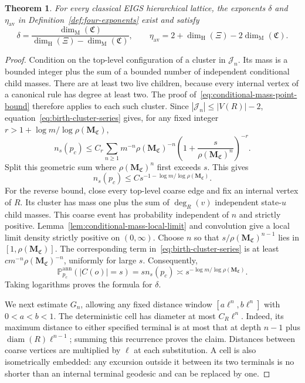 \documentclass[scheme=plain,11pt]{ctexart}
\newtheorem{theorem}{Theorem}[section]
\theoremstyle{definition}
\theoremstyle{remark}
\newcommand{\dimhaus}{\dim_{\mathrm H}}
\newcommand{\dimmass}{\dim_{\mathrm M}}
\begin{document}
\begin{theorem}\label{thm:delta-eta-dimensions}
For every classical EIGS hierarchical lattice, the exponents $\delta$ and $\eta_{\mathrm{av}}$ in Definition~\ref{def:four-exponents} exist and satisfy
\[
 \delta=\frac{\dimmass(\mathfrak C)}{\dimhaus(\Xi)-\dimmass(\mathfrak C)},
 \qquad
 \eta_{\mathrm{av}}=2+\dimhaus(\Xi)-2\dimmass(\mathfrak C).
\]
\end{theorem}
\begin{proof}
Condition on the top-level configuration of a cluster in $\mathcal J_n$.
Its mass is a bounded integer plus the sum of a bounded number of independent conditional child masses.
There are at least two live children, because every internal vertex of a canonical rule has degree at least two.
The proof of~\eqref{eq:conditional-mass-point-bound} therefore applies to each such cluster.
Since $|\mathcal J_n|\le |V(R)|-2$, equation~\eqref{eq:birth-cluster-series} gives, for any fixed integer $r>1+\log m/\log\rho(\mathbf M_{\mathfrak C})$,
\[
 n_s(p_c)\le C_r\sum_{n\ge1}
 m^{-n}\rho(\mathbf M_{\mathfrak C})^{-n}
 \left(1+\frac{s}{\rho(\mathbf M_{\mathfrak C})^n}\right)^{-r}.
\]
Split this geometric sum where $\rho(\mathbf M_{\mathfrak C})^n$ first exceeds $s$.
This gives
\[
 n_s(p_c)\le Cs^{-1-\log m/\log\rho(\mathbf M_{\mathfrak C})}.
\]
For the reverse bound, close every top-level coarse edge and fix an internal vertex of $R$.
Its cluster has mass one plus the sum of $\deg_R(v)$ independent state-$u$ child masses.
This coarse event has probability independent of $n$ and strictly positive.
Lemma~\ref{lem:conditional-mass-local-limit} and convolution give a local limit density strictly positive on $(0,\infty)$.
Choose $n$ so that $s/\rho(\mathbf M_{\mathfrak C})^{n-1}$ lies in $[1,\rho(\mathbf M_{\mathfrak C})]$.
The corresponding term in~\eqref{eq:birth-cluster-series} is at least $cm^{-n}\rho(\mathbf M_{\mathfrak C})^{-n}$, uniformly for large $s$.
Consequently,
\begin{equation}\label{eq:annealed-mass-point-law}
 \mathbb P_{p_c}^{\mathrm{ann}}(|C(o)|=s)
 =s n_s(p_c)\asymp s^{-\log m/\log\rho(\mathbf M_{\mathfrak C})}.
\end{equation}
Taking logarithms proves the formula for $\delta$.

We next estimate $G_n$, allowing any fixed distance window $[a\ell^n,b\ell^n]$ with $0<a<b<1$.
The deterministic cell has diameter at most $C_R\ell^n$.
Indeed, its maximum distance to either specified terminal is at most that at depth $n-1$ plus $\operatorname{diam}(R)\ell^{n-1}$; summing this recurrence proves the claim.
Distances between coarse vertices are multiplied by $\ell$ at each substitution.
A cell is also isometrically embedded: any excursion outside it between its two terminals is no shorter than an internal terminal geodesic and can be replaced by one.


\end{proof}
\end{document}
